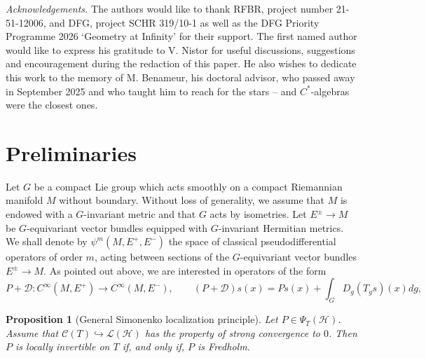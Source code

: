 \documentclass[10pt,a4paper]{amsart}
\newtheorem{proposition}{Proposition}
\newcommand{\maC}{\mathcal C}
\newcommand{\maD}{\mathcal D}
\newcommand{\maH}{\mathcal H}
\newcommand{\maL}{\mathcal L}
\begin{document}
\medskip

\noindent
{\em{Acknowledgements.}} The authors would like to thank RFBR,  project number 21-51-12006, and DFG, project SCHR 319/10-1 as well as the DFG Priority Programme 2026 `Geometry at Infinity'   
    for their support.
 The first named author would like to express his gratitude to V. Nistor for useful discussions, suggestions and encouragement during the redaction of this paper.   
 He also wishes to dedicate this work to the memory of M. Benameur, his doctoral advisor, who passed away in September 2025 and who taught him to reach for the stars -- and $C^*$-algebras were the closest ones.  
  


\section{Preliminaries}\label{sec.preliminaries}

Let $G$ be a compact Lie group which acts smoothly on a compact Riemannian manifold $M$ without boundary. 
Without loss of generality, we assume that $M$ is endowed with a $G$-invariant metric and that $G$ acts by isometries.
Let $E^\pm \rightarrow M$ be $G$-equivariant vector bundles equipped with $G$-invariant Hermitian metrics.
We shall denote by $\psi^m(M,E^+,E^-)$ the space of  
classical pseudodifferential operators of order $m$, acting between
sections of the $G$-equivariant vector bundles $E^\pm \rightarrow M$.
As pointed out above, we are interested in operators of the form
\begin{equation*}
P + \maD : C^\infty(M,E^+) \rightarrow C^\infty(M,E^-),\qquad (P + \maD) s(x)=Ps(x) + \int_G D_g (T_gs) (x) dg,
\end{equation*}

\begin{proposition}[General Simonenko localization principle]\label{prop.gen.Simonenko} 
Let $P \in \Psi_T(\maH)$.
Assume that $\maC(T)\hookrightarrow \maL(\maH)$ has the property of strong convergence to $0$.
Then
$P$ is locally invertible on $T$ if, and only if, $P$ is Fredholm.
\end{proposition}
\end{document}
